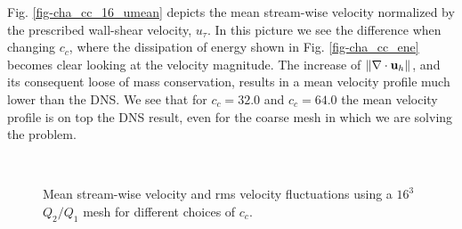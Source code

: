 Fig. \ref{fig-cha_cc_16_umean} depicts the mean stream-wise velocity normalized by the prescribed wall-shear velocity, $u_\tau$. In this picture we see the difference when changing $c_c$, where the dissipation of energy shown in Fig. \ref{fig-cha_cc_ene} becomes clear looking at the velocity magnitude. The increase of $\|\nabla\cdot{\bf u}_h\|$, and its consequent loose of mass conservation, results in a mean velocity profile much lower than the DNS. We see that for $c_c=32.0$ and $c_c=64.0$ the mean velocity profile is on top the DNS result, even for the coarse mesh in which we are solving the problem. 
\begin{figure}[h!]
	\centering	
	\\   
	\caption{Mean stream-wise velocity and rms velocity fluctuations using a $16^3$ $Q_2/Q_1$ mesh for different choices of $c_c$.}
	\label{fig-cha_cc_16}
\end{figure}

